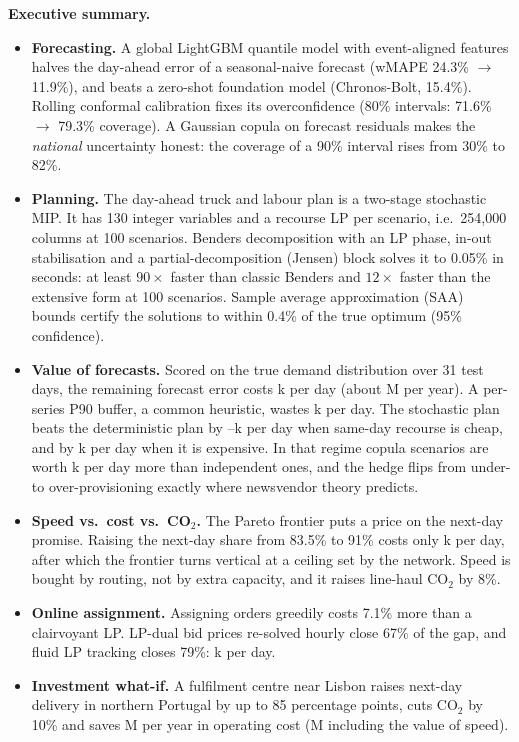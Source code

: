 \begin{keybox}
\textbf{Executive summary.}
\begin{itemize}[leftmargin=1.2em]
  \item \textbf{Forecasting.} A global LightGBM quantile model with event-aligned features halves the day-ahead error of a seasonal-naive forecast (wMAPE 24.3\% $\to$ 11.9\%), and beats a zero-shot foundation model (Chronos-Bolt, 15.4\%). Rolling conformal calibration fixes its overconfidence (80\% intervals: 71.6\% $\to$ 79.3\% coverage). A Gaussian copula on forecast residuals makes the \emph{national} uncertainty honest: the coverage of a 90\% interval rises from 30\% to 82\%.
  \item \textbf{Planning.} The day-ahead truck and labour plan is a two-stage stochastic MIP. It has 130 integer variables and a recourse LP per scenario, i.e.\ 254{,}000 columns at 100 scenarios. Benders decomposition with an LP phase, in-out stabilisation and a partial-decomposition (Jensen) block solves it to 0.05\% in seconds: at least $90\times$ faster than classic Benders and $12\times$ faster than the extensive form at 100 scenarios. Sample average approximation (SAA) bounds certify the solutions to within 0.4\% of the true optimum (95\% confidence).
  \item \textbf{Value of forecasts.} Scored on the true demand distribution over 31 test days, the remaining forecast error costs k per day (about M per year). A per-series P90 buffer, a common heuristic, wastes k per day. The stochastic plan beats the deterministic plan by --k per day when same-day recourse is cheap, and by k per day when it is expensive. In that regime copula scenarios are worth k per day more than independent ones, and the hedge flips from under- to over-provisioning exactly where newsvendor theory predicts.
  \item \textbf{Speed vs.\ cost vs.\ CO$_2$.} The Pareto frontier puts a price on the next-day promise. Raising the next-day share from 83.5\% to 91\% costs only k per day, after which the frontier turns vertical at a ceiling set by the network. Speed is bought by routing, not by extra capacity, and it raises line-haul CO$_2$ by 8\%.
  \item \textbf{Online assignment.} Assigning orders greedily costs 7.1\% more than a clairvoyant LP. LP-dual bid prices re-solved hourly close 67\% of the gap, and fluid LP tracking closes 79\%: k per day.
  \item \textbf{Investment what-if.} A fulfilment centre near Lisbon raises next-day delivery in northern Portugal by up to 85 percentage points, cuts CO$_2$ by 10\% and saves M per year in operating cost (M including the value of speed).
\end{itemize}
\end{keybox}

